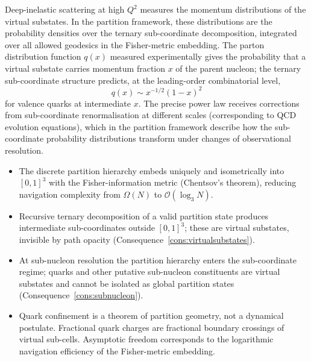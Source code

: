 Deep-inelastic scattering at high $Q^{2}$ measures the momentum distributions
of the virtual substates.  In the partition framework, these distributions are
the probability densities over the ternary sub-coordinate decomposition,
integrated over all allowed geodesics in the Fisher-metric embedding.  The
parton distribution function $q(x)$ measured experimentally gives the
probability that a virtual substate carries momentum fraction $x$ of the
parent nucleon; the ternary sub-coordinate structure predicts, at the
leading-order combinatorial level,
\[
  q(x)\sim x^{-1/2}(1-x)^{2}
\]
for valence quarks at intermediate $x$.  The precise power law receives
corrections from sub-coordinate renormalisation at different scales
(corresponding to QCD evolution equations), which in the partition framework
describe how the sub-coordinate probability distributions transform under
changes of observational resolution.

\bigskip
\begin{tcolorbox}[colback=crownblue!5, colframe=crownblue!60!black,
                  title={\textbf{Chapter 12 Summary}}]
\begin{itemize}[noitemsep]
  \item The discrete partition hierarchy embeds uniquely and isometrically
    into $[0,1]^{3}$ with the Fisher-information metric (Chentsov's theorem),
    reducing navigation complexity from $\Omega(N)$ to $\mathcal{O}(\log_{3}N)$.

  \item Recursive ternary decomposition of a valid partition state produces
    intermediate sub-coordinates outside $[0,1]^{3}$; these are virtual
    substates, invisible by path opacity (Consequence~\ref{cons:virtualsubstates}).

  \item At sub-nucleon resolution the partition hierarchy enters the
    sub-coordinate regime; quarks and other putative sub-nucleon constituents
    are virtual substates and cannot be isolated as global partition states
    (Consequence~\ref{cons:subnucleon}).

  \item Quark confinement is a theorem of partition geometry, not a dynamical
    postulate.  Fractional quark charges are fractional boundary crossings of
    virtual sub-cells.  Asymptotic freedom corresponds to the logarithmic
    navigation efficiency of the Fisher-metric embedding.
\end{itemize}
\end{tcolorbox}
